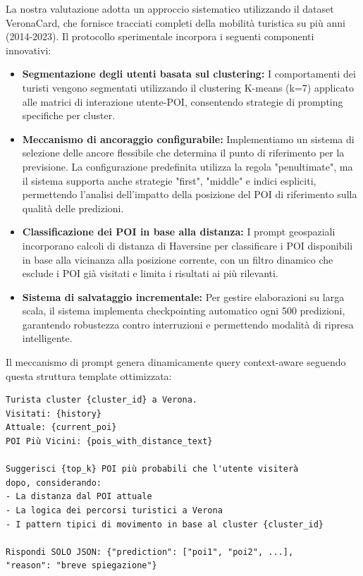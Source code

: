 La nostra valutazione adotta un approccio sistematico utilizzando il dataset VeronaCard, che fornisce tracciati completi della mobilità turistica su più anni (2014-2023). Il protocollo sperimentale incorpora i seguenti componenti innovativi:

\begin{itemize}
\item \textbf{Segmentazione degli utenti basata sul clustering:} I comportamenti dei turisti vengono segmentati utilizzando il clustering K-means (k=7) applicato alle matrici di interazione utente-POI, consentendo strategie di prompting specifiche per cluster.

\item \textbf{Meccanismo di ancoraggio configurabile:} Implementiamo un sistema di selezione delle ancore flessibile che determina il punto di riferimento per la previsione. La configurazione predefinita utilizza la regola "penultimate", ma il sistema supporta anche strategie "first", "middle" e indici espliciti, permettendo l'analisi dell'impatto della posizione del POI di riferimento sulla qualità delle predizioni.

\item \textbf{Classificazione dei POI in base alla distanza:} I prompt geospaziali incorporano calcoli di distanza di Haversine per classificare i POI disponibili in base alla vicinanza alla posizione corrente, con un filtro dinamico che esclude i POI già visitati e limita i risultati ai più rilevanti.

\item \textbf{Sistema di salvataggio incrementale:} Per gestire elaborazioni su larga scala, il sistema implementa checkpointing automatico ogni 500 predizioni, garantendo robustezza contro interruzioni e permettendo modalità di ripresa intelligente.
\end{itemize}

Il meccanismo di prompt genera dinamicamente query context-aware seguendo questa struttura template ottimizzata:

\begin{center}
\begin{lstlisting}[language=text, caption=Template di Prompt Comprensivo, captionpos=b]
Turista cluster {cluster_id} a Verona.
Visitati: {history}
Attuale: {current_poi}
POI Più Vicini: {pois_with_distance_text}

Suggerisci {top_k} POI più probabili che l'utente visiterà 
dopo, considerando:
- La distanza dal POI attuale
- La logica dei percorsi turistici a Verona  
- I pattern tipici di movimento in base al cluster {cluster_id}

Rispondi SOLO JSON: {"prediction": ["poi1", "poi2", ...], 
"reason": "breve spiegazione"}
\end{lstlisting}
\end{center}

